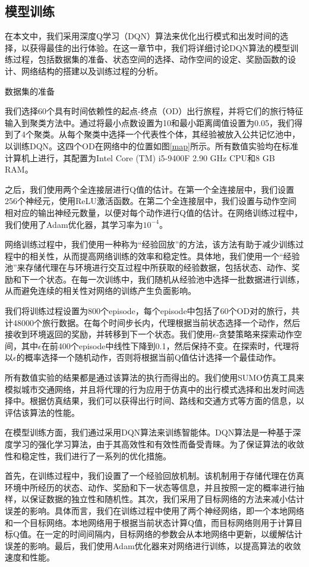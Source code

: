 \subsection{模型训练}

在本文中，我们采用深度Q学习（DQN）算法来优化出行模式和出发时间的选择，以获得最佳的出行体验。在这一章节中，我们将详细讨论DQN算法的模型训练过程，包括数据集的准备、状态空间的选择、动作空间的设定、奖励函数的设计、网络结构的搭建以及训练过程的分析。

数据集的准备

我们选择60个具有时间依赖性的起点-终点（OD）出行旅程，并将它们的旅行特征输入到聚类方法中。通过将最小点数设置为10和最小距离阈值设置为0.05，我们得到了4个聚类。从每个聚类中选择一个代表性个体，其经验被放入公共记忆池中，以训练DQN。这四个OD在网络中的位置如图\ref{map}所示。所有数值实验均在标准计算机上进行，其配置为Intel Core (TM) i5-9400F 2.90 GHz CPU和8 GB RAM。

之后，我们使用两个全连接层进行Q值的估计。在第一个全连接层中，我们设置256个神经元，使用ReLU激活函数。在第二个全连接层中，我们设置与动作空间相对应的输出神经元数量，以便对每个动作进行Q值的估计。在网络训练过程中，我们使用了Adam优化器，其学习率为$10^{-4}$。

网络训练过程中，我们使用一种称为“经验回放”的方法，该方法有助于减少训练过程中的相关性，从而提高网络训练的效率和稳定性。具体地，我们使用一个“经验池”来存储代理在与环境进行交互过程中所获取的经验数据，包括状态、动作、奖励和下一个状态。在每一次训练中，我们随机从经验池中选择一批数据进行训练，从而避免连续的相关性对网络的训练产生负面影响。

我们将训练过程设置为800个episode，每个episode中包括了60个OD对的旅行，共计48000个旅行数据。在每个时间步长内，代理根据当前状态选择一个动作，然后接收到环境返回的奖励，并转移到下一个状态。我们使用$\epsilon$-贪婪策略来探索动作空间，其中$\epsilon$在前400个episode中线性下降到0.1，然后保持不变。在探索时，代理将以$\epsilon$的概率选择一个随机动作，否则将根据当前Q值估计选择一个最佳动作。

所有数值实验的结果都是通过该算法的执行而得出的。我们使用SUMO仿真工具来模拟城市交通网络，并且将代理的行为应用于仿真中的出行模式选择和出发时间选择中。根据仿真结果，我们可以获得出行时间、路线和交通方式等方面的信息，以评估该算法的性能。

在模型训练方面，我们通过采用DQN算法来训练智能体。DQN算法是一种基于深度学习的强化学习算法，由于其高效性和有效性而备受青睐。为了保证算法的收敛性和稳定性，我们进行了一系列的优化措施。

首先，在训练过程中，我们设置了一个经验回放机制。该机制用于存储代理在仿真环境中所经历的状态、动作、奖励和下一状态等信息，并且按照一定的概率进行抽样，以保证数据的独立性和随机性。其次，我们采用了目标网络的方法来减小估计误差的影响。具体而言，我们在训练过程中使用了两个神经网络，即一个本地网络和一个目标网络。本地网络用于根据当前状态计算Q值，而目标网络则用于计算目标Q值。在一定的时间间隔内，目标网络的参数会从本地网络中更新，以缓解估计误差的影响。最后，我们使用Adam优化器来对网络进行训练，以提高算法的收敛速度和性能。

